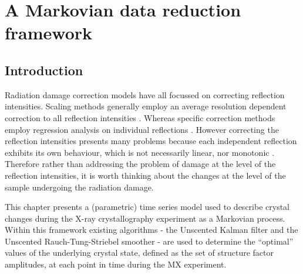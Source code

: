\chapter{A Markovian data reduction framework}
\label{chap:A Markovian data reduction framework}

\section{Introduction}
\label{sec:Introduction - Data Reduction}
Radiation damage correction models have all focussed on correcting reflection intensities.
Scaling methods generally employ an average resolution dependent correction to all reflection intensities \cite{evans2005,evans2013,kabsch2010integration}.
Whereas specific correction methods employ regression analysis on individual reflections \cite{diederichs2003,diederichs2006}.
However correcting the reflection intensities presents many problems because each independent reflection exhibits its own behaviour, which is not necessarily linear, nor monotonic \cite{abrahams1987anisotropy}.
Therefore rather than addressing the problem of damage at the level of the reflection intensities, it is worth thinking about the changes at the level of the sample undergoing the radiation damage.

This chapter presents a (parametric) time series model used to describe crystal changes during the X-ray crystallography experiment as a Markovian process. Within this framework existing algorithms - the Unscented Kalman filter and the Unscented Rauch-Tung-Striebel smoother - are used to determine the ``optimal'' values of the underlying crystal state, defined as the set of structure factor amplitudes, at each point in time during the MX experiment.
